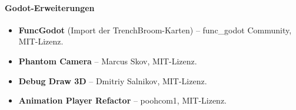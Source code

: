 \documentclass[../Main.tex]{subfiles}
\begin{document}
\paragraph{Godot-Erweiterungen}
\begin{itemize}[leftmargin=1.5cm]
\item \textbf{FuncGodot} (Import der TrenchBroom-Karten) -- func\_godot Community, MIT-Lizenz.
\item \textbf{Phantom Camera} -- Marcus Skov, MIT-Lizenz.
\item \textbf{Debug Draw 3D} -- Dmitriy Salnikov, MIT-Lizenz.
\item \textbf{Animation Player Refactor} -- poohcom1, MIT-Lizenz.
\end{itemize}
\end{document}
